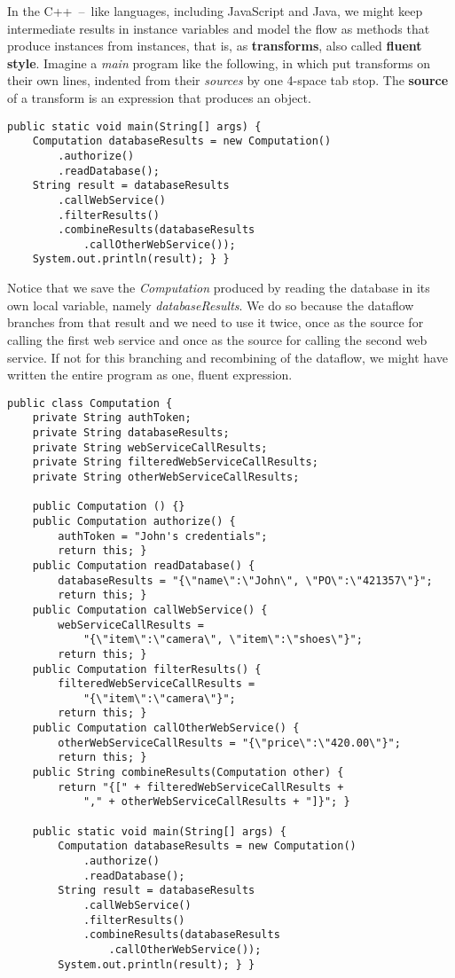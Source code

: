 \documentclass[11pt]{article}
\begin{document}
In the \mbox{C++ -- like} languages, including JavaScript and Java,
we might keep intermediate results in instance variables and model
the flow as methods that produce instances from instances, that is,
as \textbf{transforms}, also called \textbf{fluent style}. Imagine a
\emph{main} program like the following, in which put transforms on their
own lines, indented from their \emph{sources} by one \mbox{4-space} tab
stop. The \textbf{source} of a transform is an expression that
produces an object.

\begin{verbatim}
public static void main(String[] args) {
    Computation databaseResults = new Computation()
        .authorize()
        .readDatabase();
    String result = databaseResults
        .callWebService()
        .filterResults()
        .combineResults(databaseResults
            .callOtherWebService());
    System.out.println(result); } }
\end{verbatim}

Notice that we save the \emph{Computation} produced by reading the
database in its own local variable, namely \emph{databaseResults}. We do
so because the dataflow branches from that result and we need to
use it twice, once as the source for calling the first web service
and once as the source for calling the second web service. If not
for this branching and recombining of the dataflow, we might have
written the entire program as one, fluent expression. 

\begin{verbatim}
public class Computation {
    private String authToken;
    private String databaseResults;
    private String webServiceCallResults;
    private String filteredWebServiceCallResults;
    private String otherWebServiceCallResults;

    public Computation () {}
    public Computation authorize() {
        authToken = "John's credentials";
        return this; }
    public Computation readDatabase() {
        databaseResults = "{\"name\":\"John\", \"PO\":\"421357\"}";
        return this; }
    public Computation callWebService() {
        webServiceCallResults =
            "{\"item\":\"camera\", \"item\":\"shoes\"}";
        return this; }
    public Computation filterResults() {
        filteredWebServiceCallResults =
            "{\"item\":\"camera\"}";
        return this; }
    public Computation callOtherWebService() {
        otherWebServiceCallResults = "{\"price\":\"420.00\"}";
        return this; }
    public String combineResults(Computation other) {
        return "{[" + filteredWebServiceCallResults +
            "," + otherWebServiceCallResults + "]}"; }

    public static void main(String[] args) {
        Computation databaseResults = new Computation()
            .authorize()
            .readDatabase();
        String result = databaseResults
            .callWebService()
            .filterResults()
            .combineResults(databaseResults
                .callOtherWebService());
        System.out.println(result); } }
\end{verbatim}
\end{document}
